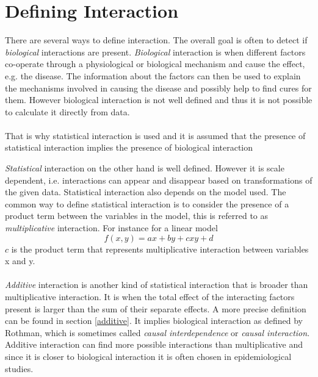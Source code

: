 \documentclass[10pt,a4paper]{report}
\begin{document}
\section{Defining Interaction}
\label{interaction}
There are several ways to define interaction. The overall goal is often to detect if \emph{biological} interactions are present. \emph{Biological} interaction is when different factors co-operate through a physiological or biological mechanism and cause the effect, e.g. the disease. The information about the factors can then be used to explain the mechanisms involved in causing the disease and possibly help to find cures for them. However biological interaction is not well defined and thus it is not possible to calculate it directly from data.\cite{interaction_confusion, rothman2008modern,rothman2002intro_epidemiology}\\
\\
That is why statistical interaction is used and it is assumed that the presence of statistical interaction implies the presence of biological interaction

\emph{Statistical} interaction on the other hand is well defined. However it is scale dependent, i.e. interactions can appear and disappear based on transformations of the given data. Statistical interaction also depends on the model used. The common way to define statistical interaction is to consider the presence of a product term between the variables in the model, this is referred to as \emph{multiplicative} interaction. For instance for a linear model
\begin{equation}
f(x,y)=ax+by+cxy+d
\end{equation}
$c$ is the product term that represents multiplicative interaction between variables x and y. \cite{geira, interaction_confusion, rothman2008modern}\\
\\
\emph{Additive} interaction is another kind of statistical interaction that is broader than multiplicative interaction. It is when the total effect of the interacting factors present is larger than the sum of their separate effects. A more precise definition can be found in section \ref{additive}. It implies biological interaction as defined by Rothman\cite{rothman2008modern}, which is sometimes called \emph{causal interdependence} or \emph{causal interaction}\cite{causal_bounds_arvid}. Additive interaction can find more possible interactions than multiplicative and since it is closer to biological interaction it is often chosen in epidemiological studies\cite{interaction_confusion}.  
\end{document}
